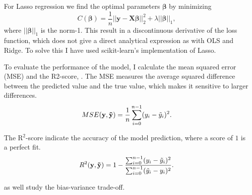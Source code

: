 For Lasso regression we find the optimal parameters $\mathbf{\beta}$ by minimizing
\begin{equation}\label{eq:lasso_cost}
    C (\mathbf{\beta}) = \frac{1}{n} || \mathbf{y} - \mathbf{X} \mathbf{\beta} ||_{2}^{2} + \lambda || \mathbf{\beta} ||_{1} ,
\end{equation}
where $|| \mathbf{\beta} ||_{1}$ is the norm-1. This result in a discontinuous derivative of the loss function, which does not give a direct analytical expression as with OLS and Ridge. To solve this I have used scikit-learn's implementation of Lasso.


To evaluate the performance of the model, I calculate the mean squared error (MSE) and the R2-score, . The MSE measures the average squared difference between the predicted value and the true value, which makes it sensitive to larger differences. 
\begin{equation}\label{eq:mse}
    MSE(\mathbf{y}, \mathbf{\Tilde{y}}) = \frac{1}{n} \sum_{i=0}^{n-1} (y_{i} - \Tilde{y}_{i})^{2}.
\end{equation}

The R$^{2}$-score indicate the accuracy of the model prediction, where a score of $1$ is a perfect fit.
\begin{equation}\label{eq:r2}
    R^{2}(\mathbf{y}, \mathbf{\Tilde{y}}) = 1 - \frac{\sum_{i=0}^{n-1} (y_{i} - \Tilde{y}_{i})^{2}}{\sum_{i=0}^{n-1} (\Tilde{y}_{i} - y_{i})^{2}}.
\end{equation}

as well study the bias-variance trade-off. 